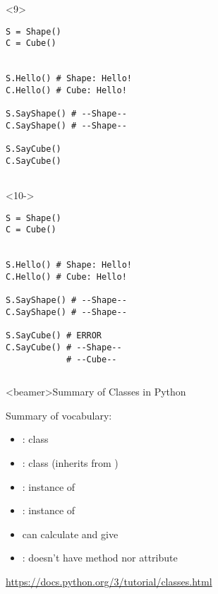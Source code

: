 \begin{frame}[fragile]{}
\begin{columns}[onlytextwidth]
\begin{column}{0.47\textwidth}
      \begin{onlyenv}<9>
        \begin{lstlisting}[style=python,basicstyle=\ttfamily\footnotesize]
S = Shape()
C = Cube()


S.Hello() # Shape: Hello!
C.Hello() # Cube: Hello!

S.SayShape() # --Shape--
C.SayShape() # --Shape--

S.SayCube()
C.SayCube()


 \end{lstlisting}
      \end{onlyenv}

      \begin{onlyenv}<10->
        \begin{lstlisting}[style=python,basicstyle=\ttfamily\footnotesize]
S = Shape()
C = Cube()


S.Hello() # Shape: Hello!
C.Hello() # Cube: Hello!

S.SayShape() # --Shape--
C.SayShape() # --Shape--

S.SayCube() # ERROR
C.SayCube() # --Shape--
            # --Cube--

 \end{lstlisting}
      \end{onlyenv}

    \end{column}
  \end{columns}

\end{frame}


\begin{frame}<beamer>{Summary of Classes in Python}

  Summary of vocabulary:

  \begin{itemize}
    \item<2-> : class
    \item<3-> : class (inherits from )
    \item<4-> : instance of 
    \item<5-> : instance of 
  \end{itemize}

  \begin{itemize}
  \item<6->  can calculate and give 
  \item<7-> : doesn't have  method nor attribute
  \end{itemize}

  \begin{center}
     \url{https://docs.python.org/3/tutorial/classes.html}
  \end{center}

\end{frame}
